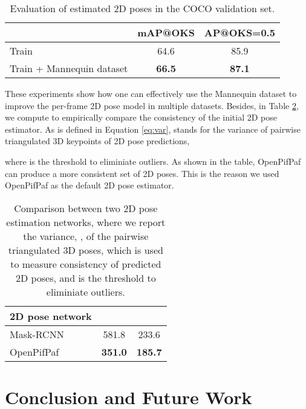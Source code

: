 \documentclass{article}
\begin{document}
\begin{table}[h]
\centering
\begin{tabular}{l|cc} \hline \hline
& mAP@OKS   & AP@OKS=0.5  \\ \hline
Train & 64.6 & 85.9 \\
Train + Mannequin dataset & \textbf{66.5} & \textbf{87.1} \\ \hline \hline
\end{tabular}
\caption{Evaluation of estimated 2D poses in the COCO validation set.}\label{tab:evalution2}
\end{table}




These experiments show how one can effectively use the Mannequin dataset
to improve the per-frame 2D pose model in multiple datasets.  Besides, in Table
\ref{tab:2d-consistency}, we compute  to empirically compare the consistency of the initial 2D pose estimator. As is defined in Equation \ref{eq:var},  stands for the variance of pairwise triangulated 3D keypoints of 2D pose predictions,


where  is the threshold to eliminiate outliers.  As shown
in the table, OpenPifPaf can produce a more consistent set of 2D poses.
This is the reason we used OpenPifPaf as the default 2D pose estimator. 

\begin{table}[h] \centering
\begin{tabular}{l|cc}\hline\hline
2D pose network &  &  \\ \hline \hline
Mask-RCNN \cite{he2017mask} & 581.8 & 233.6 \\
OpenPifPaf \cite{kreiss2019pifpaf} & \textbf{351.0} & \textbf{185.7} \\ \hline \hline
\end{tabular}
\caption{Comparison between two 2D pose estimation networks, where we
report the variance, , of the pairwise triangulated 3D poses,
which is used to measure consistency of predicted 2D poses, and 
is the threshold to eliminiate outliers.} \label{tab:2d-consistency}
\end{table}


\section{Conclusion and Future Work}\label{sec:conclusion}
\end{document}
